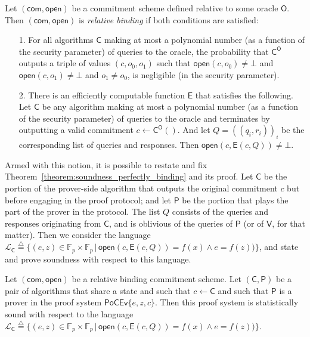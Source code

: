\documentclass[10pt]{llncs}
\begin{document}
\begin{definition} \label{definition:relative_binding}
Let $(\mathsf{com}, \mathsf{open})$ be a commitment scheme defined relative to some oracle $\mathsf{O}$. Then $(\mathsf{com}, \mathsf{open})$ is \emph{relative binding} if both conditions are satisfied:
\begin{itemize}
\item[1.] For all algorithms $\mathsf{C}$ making at most a polynomial number (as a function of the security parameter) of queries to the oracle, the probability that $\mathsf{C}^\mathsf{O}$ outputs a triple of values $(c, o_0, o_1)$ such that $\mathsf{open}(c, o_0) \neq \bot$ and $\mathsf{open}(c, o_1) \neq \bot$ and $o_1 \neq o_0$, is negligible (in the security parameter).
\item[2.] There is an efficiently computable function $\mathsf{E}$ that satisfies the following. Let $\mathsf{C}$ be any algorithm making at most a polynomial number (as a function of the security parameter) of queries to the oracle and terminates by outputting a valid commitment $c \leftarrow \mathsf{C}^\mathsf{O}()$. And let $Q = ((q_i, r_i))_{i}$ be the corresponding list of queries and responses. Then $\mathsf{open}(c, \mathsf{E}(c, Q)) \neq \bot$.
\end{itemize}
\end{definition}

Armed with this notion, it is possible to restate and fix Theorem~\ref{theorem:soundness_perfectly_binding} and its proof. Let $\mathsf{C}$ be the portion of the prover-side algorithm that outputs the original commitment $c$ but before engaging in the proof protocol; and let $\mathsf{P}$ be the portion that plays the part of the prover in the protocol. The list $Q$ consists of the queries and responses originating from $\mathsf{C}$, and is oblivious of the queries of $\mathsf{P}$ (or of $\mathsf{V}$, for that matter). Then we consider the language $\mathcal{L}_{\mathsf{C}} \stackrel{\triangle}{=} \{(e,z) \in \mathbb{F}_p \times \mathbb{F}_p \, | \, \mathsf{open}(c, \mathsf{E}(c, Q)) = f(x) \wedge e = f(z))\}$, and state and prove soundness with respect to this language.

\begin{theorem} \label{theorem:soundness_relative_binding}
Let $(\mathsf{com}, \mathsf{open})$ be a relative binding commitment scheme. Let $(\mathsf{C}, \mathsf{P})$ be a pair of algorithms that share a state and such that $c \leftarrow \mathsf{C}$ and such that $\mathsf{P}$ is a prover in the proof system $\mathsf{PoCEv}\{e, z, c \}$. Then this proof system is statistically sound with respect to the language $\mathcal{L}_{\mathsf{C}} \stackrel{\triangle}{=} \{(e,z) \in \mathbb{F}_p \times \mathbb{F}_p \, | \, \mathsf{open}(c, \mathsf{E}(c, Q)) = f(x) \wedge e = f(z))\}$.
\end{theorem}
\end{document}

